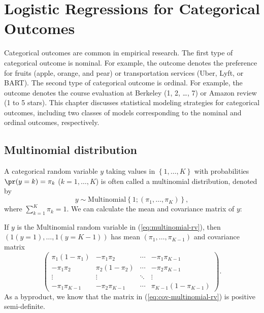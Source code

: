  
\chapter{Logistic Regressions for Categorical Outcomes} 
\label{chapter::logit-categorical}
 

Categorical outcomes are common in empirical research. The first type of categorical outcome is nominal. For example, the outcome denotes the preference for fruits (apple, orange, and pear) or transportation services (Uber, Lyft, or BART). The second type of categorical outcome is ordinal. For example, the outcome denotes the course evaluation at Berkeley (1, 2, \ldots, 7) or Amazon review (1 to 5 stars).  
This chapter discusses statistical modeling strategies for categorical outcomes, including two classes of models corresponding to the nominal and ordinal outcomes, respectively.  
 
 

\section{Multinomial distribution}



A categorical random variable $y$ taking values in $\left\{ 1,\ldots,K\right\} $
with probabilities $\pr(y=k)=\pi_{k}$  ($k=1,\ldots,K$) is
often called a multinomial distribution, denoted by
\begin{equation}
y\sim\text{Multinomial}\left\{ 1;(\pi_{1},\ldots,\pi_{K})\right\} ,\label{eq:multinomial-rv}
\end{equation}
where $\sum_{k=1}^{K}\pi_{k}=1.$
We can calculate the mean and covariance matrix of $y$:
\begin{proposition}
\label{proposition:positive-semi-definite-multinomial}If $y$ is the Multinomial
random variable in (\ref{eq:multinomial-rv}), then $(1(y=1),\ldots,1(y=K-1))$
has mean $(\pi_{1},\ldots,\pi_{K-1})$ and covariance matrix
\begin{equation}
\left(\begin{array}{cccc}
\pi_{1}(1-\pi_{1}) & -\pi_{1}\pi_{2} & \cdots & -\pi_{1}\pi_{K-1}\\
-\pi_{1}\pi_{2} & \pi_{2}(1-\pi_{2}) & \cdots & -\pi_{2}\pi_{K-1}\\
\vdots & \vdots & \ddots & \vdots\\
-\pi_{1}\pi_{K-1} & -\pi_{2}\pi_{K-1} & \cdots & \pi_{K-1}(1-\pi_{K-1})
\end{array}\right).\label{eq:cov-multinomial-rv}
\end{equation}
As a byproduct, we know that the matrix in (\ref{eq:cov-multinomial-rv})
is positive semi-definite.
\end{proposition}



